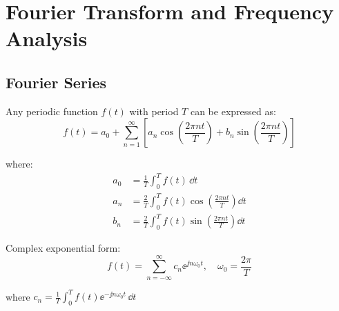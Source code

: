 \chapter{Fourier Transform and Frequency Analysis}
\label{ch:fourier}

\section{Fourier Series}

Any periodic function $f(t)$ with period $T$ can be expressed as:
\begin{equation}
f(t) = a_0 + \sum_{n=1}^{\infty} \left[ a_n \cos\left(\frac{2\pi nt}{T}\right) + b_n \sin\left(\frac{2\pi nt}{T}\right) \right]
\end{equation}

where:
\begin{align}
a_0 &= \frac{1}{T} \int_0^T f(t) \, \dd t \\
a_n &= \frac{2}{T} \int_0^T f(t) \cos\left(\frac{2\pi nt}{T}\right) \dd t \\
b_n &= \frac{2}{T} \int_0^T f(t) \sin\left(\frac{2\pi nt}{T}\right) \dd t
\end{align}

Complex exponential form:
\begin{equation}
f(t) = \sum_{n=-\infty}^{\infty} c_n \ee^{\jj n \omega_0 t}, \quad \omega_0 = \frac{2\pi}{T}
\end{equation}

where $c_n = \frac{1}{T} \int_0^T f(t) \ee^{-\jj n \omega_0 t} \, \dd t$



